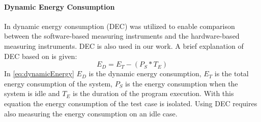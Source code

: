 \paragraph{Dynamic Energy Consumption}
In \cite{fahad2019comparative,biksbois} dynamic energy consumption (DEC) was utilized to enable comparison between the software-based measuring instruments and the hardware-based measuring instruments. DEC is also used in our work. A brief explanation of DEC based on \cite{fahad2019comparative} is given:
\begin{equation}\label{eq:dynamicEnergy}
    E_D = E_T - (P_S * T_E)
\end{equation}
In \cref{eq:dynamicEnergy} $E_D$ is the dynamic energy consumption, $E_T$ is the total energy consumption of the system, $P_S$ is the energy consumption when the system is idle and $T_E$ is the duration of the program execution. With this equation the energy consumption of the test case is isolated. Using DEC requires also measuring the energy consumption on an idle case. \cite{fahad2019comparative}
